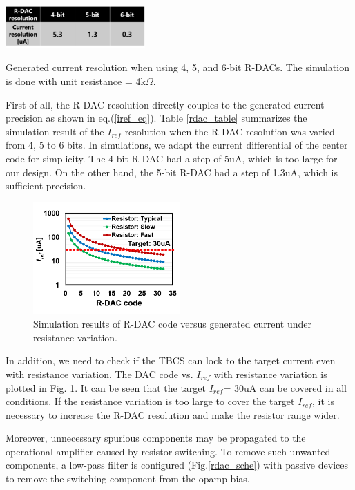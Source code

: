 \documentclass[letterpaper, 10 pt, conference]{ieeeconf}  %
\begin{document}
\begin{table}[]
\centering
 \includegraphics[width=0.4\textwidth]{figs/rdac_table.png}
  \caption{Generated current resolution when using 4, 5, and 6-bit R-DACs. The simulation is done with unit resistance = 4k$\Omega$.}
\label{rdac_table}
\end{table}

First of all, the R-DAC resolution directly couples to the generated current precision as shown in eq.(\ref{iref_eq}). Table \ref{rdac_table} summarizes the simulation result of the $I_{ref}$ resolution when the R-DAC resolution was varied from 4, 5 to 6 bits. In simulations, we adapt the current differential of the center code for simplicity. The 4-bit R-DAC had a step of 5uA, which is too large for our design. On the other hand, the 5-bit R-DAC had a step of 1.3uA, which is sufficient precision.

\begin{figure}[!]
\centering
 \includegraphics[width=0.5\textwidth]{figs/rdaccode.png}
  \caption{Simulation results of R-DAC code versus generated current under resistance variation.}
\label{rdac_pvt}
\end{figure}

In addition, we need to check if the TBCS can lock to the target current even with resistance variation. The DAC code vs. $I_{ref}$ with resistance variation is plotted in Fig. \ref{rdac_pvt}. It can be seen that the target $I_{ref}$= 30uA can be covered in all conditions. If the resistance variation is too large to cover the target $I_{ref}$, it is necessary to increase the R-DAC resolution and make the resistor range wider.

Moreover, unnecessary spurious components may be propagated to the operational amplifier caused by resistor switching. To remove such unwanted components, a low-pass filter is configured (Fig.\ref{rdac_sche}) with passive devices to remove the switching component from the opamp bias.
\end{document}

